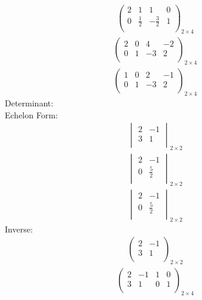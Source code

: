 \documentclass{article}
\begin{document}
\begin{align*}
\left(
\begin{array}{cc|cc}
2 & 1 & 1 & 0\\
0 & \frac{1}{2} & -\frac{3}{2} & 1\\
\end{array}
\right)_{2\times 4}
\end{align*}
\begin{align*}
\left(
\begin{array}{cc|cc}
2 & 0 & 4 & -2\\
0 & 1 & -3 & 2\\
\end{array}
\right)_{2\times 4}
\end{align*}
\begin{align*}
\left(
\begin{array}{cc|cc}
1 & 0 & 2 & -1\\
0 & 1 & -3 & 2\\
\end{array}
\right)_{2\times 4}
\end{align*}
Determinant:\\
Echelon Form:\\
\begin{align*}
\begin{vmatrix}
2 & -1\\
3 & 1\\
\end{vmatrix}_{2\times 2}
\end{align*}
\begin{align*}
\begin{vmatrix}
2 & -1\\
0 & \frac{5}{2}\\
\end{vmatrix}_{2\times 2}
\end{align*}
\begin{align*}
\begin{vmatrix}
2 & -1\\
0 & \frac{5}{2}\\
\end{vmatrix}_{2\times 2}
\end{align*}
Inverse:\\
\begin{align*}
\begin{pmatrix}
2 & -1\\
3 & 1\\
\end{pmatrix}_{2\times 2}
\end{align*}
\begin{align*}
\left(
\begin{array}{cc|cc}
2 & -1 & 1 & 0\\
3 & 1 & 0 & 1\\
\end{array}
\right)_{2\times 4}
\end{align*}
\end{document}
